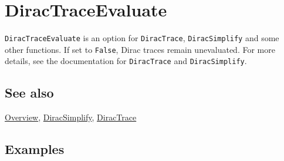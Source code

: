 \documentclass[../FeynCalcManual.tex]{subfiles}
\begin{document}
\hypertarget{diractraceevaluate}{
\section{DiracTraceEvaluate}\label{diractraceevaluate}}

\texttt{DiracTraceEvaluate} is an option for \texttt{DiracTrace},
\texttt{DiracSimplify} and some other functions. If set to
\texttt{False}, Dirac traces remain unevaluated. For more details, see
the documentation for \texttt{DiracTrace} and \texttt{DiracSimplify}.

\subsection{See also}

\hyperlink{toc}{Overview}, \hyperlink{diracsimplify}{DiracSimplify},
\hyperlink{diractrace}{DiracTrace}

\subsection{Examples}
\end{document}
